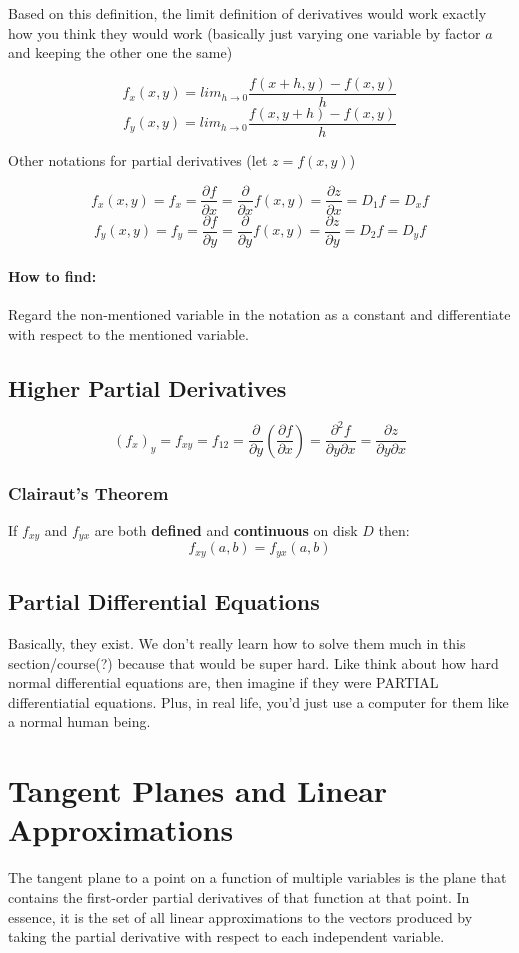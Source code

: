 \documentclass[a4paper,12pt]{report}
\begin{document}
Based on this definition, the limit definition of derivatives would work exactly how you think they would work (basically just varying one variable by factor $a$ and keeping the other one the same)

$$f_x(x, y) = lim_{h\to 0}\frac{f(x+h, y)-f(x, y)}{h}$$
$$f_y(x, y) = lim_{h\to 0}\frac{f(x, y+h)-f(x, y)}{h}$$

Other notations for partial derivatives (let $z = f(x, y)$)

$$f_x(x, y) = f_x = \frac{\partial f}{\partial x} = \frac{\partial}{\partial x} f(x, y) = \frac{\partial z}{\partial x} = D_1f = D_xf$$
$$f_y(x, y) = f_y = \frac{\partial f}{\partial y} = \frac{\partial}{\partial y} f(x, y) = \frac{\partial z}{\partial y} = D_2f = D_yf$$

\paragraph{How to find: }
Regard the non-mentioned variable in the notation as a constant and differentiate with respect to the mentioned variable.

\subsection{Higher Partial Derivatives}
$$(f_x)_y = f_{xy} = f_{12} = \frac{\partial}{\partial y} (\frac{\partial f}{\partial x}) = \frac{\partial ^2 f}{\partial y \partial x} = \frac{\partial z}{\partial y \partial x}$$

\subsubsection{Clairaut's Theorem}
If $f_{xy}$ and $f_{yx}$ are both \textbf{defined} and \textbf{continuous} on disk $D$ then:
$$f_{xy}(a, b) = f_{yx}(a, b)$$

\subsection{Partial Differential Equations}
Basically, they exist. We don't really learn how to solve them much in this section/course(?) because that would be super hard. Like think about how hard normal differential equations are, then imagine if they were PARTIAL differentiatial equations. Plus, in real life, you'd just use a computer for them like a normal human being. 

\section{Tangent Planes and Linear Approximations}
The tangent plane to a point on a function of multiple variables is the plane that contains the first-order partial derivatives of that function at that point. In essence, it is the set of all linear approximations to the vectors produced by taking the partial derivative with respect to each independent variable.
\end{document}
